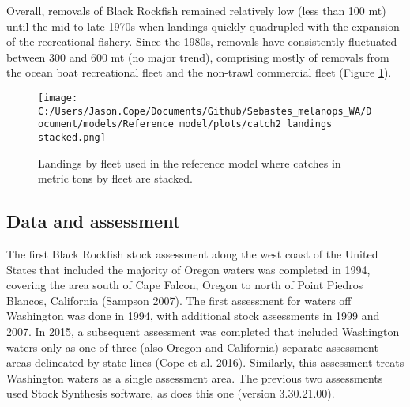 \documentclass[11pt,
  english,
  letterpaper,
]{article}
\begin{document}
Overall, removals of Black Rockfish remained relatively low (less than 100 mt) until the mid to late 1970s when landings quickly quadrupled with the expansion of the recreational fishery. Since the 1980s, removals have consistently fluctuated between 300 and 600 mt (no major trend), comprising mostly of removals from the ocean boat recreational fleet and the non-trawl commercial fleet (Figure \ref{fig:es-catch}).



\begin{figure}
\centering
\texttt{[image: C:/Users/Jason.Cope/Documents/Github/Sebastes\_melanops\_WA/Document/models/Reference model/plots/catch2 landings stacked.png]}
\caption{Landings by fleet used in the reference model where catches in metric tons by fleet are stacked.\label{fig:es-catch}}
\end{figure}

\clearpage

\hypertarget{data-and-assessment}{%
\subsection*{Data and assessment}\label{data-and-assessment}}

The first Black Rockfish stock assessment along the west coast of the United States that included the majority of Oregon waters was completed in 1994, covering the area south of Cape Falcon, Oregon to north of Point Piedros Blancos, California (Sampson 2007). The first assessment for waters off Washington was done in 1994, with additional stock assessments in 1999 and 2007. In 2015, a subsequent assessment was completed that included Washington waters only as one of three (also Oregon and California) separate assessment areas delineated by state lines (Cope et al. 2016). Similarly, this assessment treats Washington waters as a single assessment area. The previous two assessments used Stock Synthesis software, as does this one (version 3.30.21.00).
\end{document}
